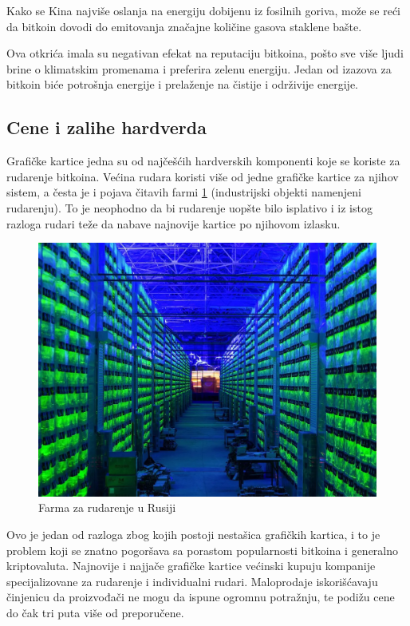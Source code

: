\documentclass[a4paper]{article}
\begin{document}
Kako se Kina najviše oslanja na energiju dobijenu iz fosilnih goriva, može se reći da bitkoin dovodi do emitovanja značajne količine gasova staklene bašte.

Ova otkrića imala su negativan efekat na reputaciju bitkoina, pošto sve više ljudi brine o klimatskim promenama i preferira zelenu energiju. Jedan od izazova za bitkoin biće potrošnja energije i prelaženje na čistije i održivije energije.


\subsection{Cene i zalihe hardverda }

Grafičke kartice jedna su od najčešćih hardverskih komponenti koje se koriste za rudarenje bitkoina. Većina rudara koristi više od jedne grafičke kartice za njihov sistem, a česta je i pojava čitavih farmi \ref{fig:farma} (industrijski objekti namenjeni rudarenju). To je neophodno da bi rudarenje uopšte bilo isplativo i iz istog razloga rudari teže da nabave najnovije kartice po njihovom izlasku.


\begin{figure}[h!]
	\begin{center}
		\includegraphics[scale=0.25]{farma.jpg}
	\end{center}
	\caption{Farma za rudarenje u Rusiji}
	\label{fig:farma}
\end{figure}

Ovo je jedan od razloga zbog kojih postoji nestašica grafičkih kartica, i to je problem koji se znatno pogoršava sa porastom popularnosti bitkoina i generalno kriptovaluta. Najnovije i najjače grafičke kartice većinski kupuju kompanije specijalizovane za rudarenje i individualni rudari. Maloprodaje iskorišćavaju činjenicu da proizvođači ne mogu da ispune ogromnu potražnju, te podižu cene do čak tri puta više od preporučene.
\end{document}
